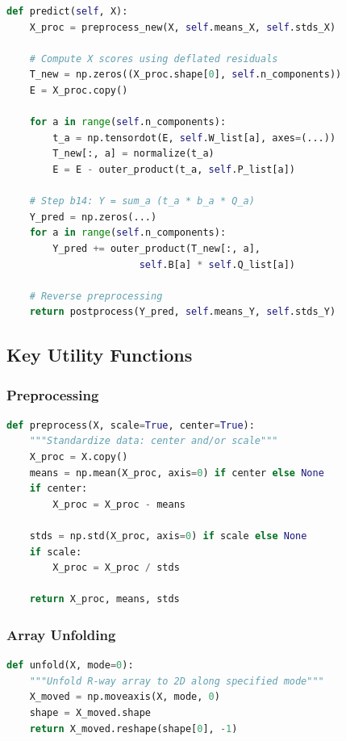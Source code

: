 \documentclass[12pt,a4paper]{article}
\begin{document}
\begin{lstlisting}[language=Python, breaklines=true, basicstyle=\ttfamily\tiny]
def predict(self, X):
    X_proc = preprocess_new(X, self.means_X, self.stds_X)

    # Compute X scores using deflated residuals
    T_new = np.zeros((X_proc.shape[0], self.n_components))
    E = X_proc.copy()

    for a in range(self.n_components):
        t_a = np.tensordot(E, self.W_list[a], axes=(...))
        T_new[:, a] = normalize(t_a)
        E = E - outer_product(t_a, self.P_list[a])

    # Step b14: Y = sum_a (t_a * b_a * Q_a)
    Y_pred = np.zeros(...)
    for a in range(self.n_components):
        Y_pred += outer_product(T_new[:, a],
                       self.B[a] * self.Q_list[a])

    # Reverse preprocessing
    return postprocess(Y_pred, self.means_Y, self.stds_Y)
\end{lstlisting}

\subsection{Key Utility Functions}

\subsubsection{Preprocessing}
\begin{lstlisting}[language=Python]
def preprocess(X, scale=True, center=True):
    """Standardize data: center and/or scale"""
    X_proc = X.copy()
    means = np.mean(X_proc, axis=0) if center else None
    if center:
        X_proc = X_proc - means

    stds = np.std(X_proc, axis=0) if scale else None
    if scale:
        X_proc = X_proc / stds

    return X_proc, means, stds
\end{lstlisting}

\subsubsection{Array Unfolding}
\begin{lstlisting}[language=Python]
def unfold(X, mode=0):
    """Unfold R-way array to 2D along specified mode"""
    X_moved = np.moveaxis(X, mode, 0)
    shape = X_moved.shape
    return X_moved.reshape(shape[0], -1)
\end{lstlisting}
\end{document}
